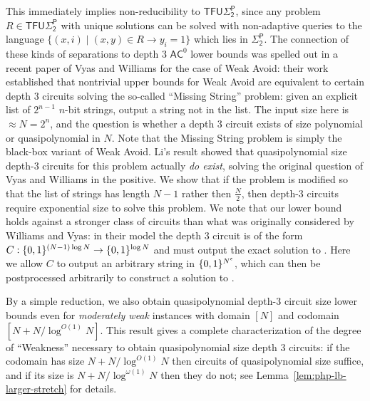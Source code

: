 This immediately implies non-reducibility to $\mathsf{TFU\Sigma_2^P}$, since any problem $R \in \mathsf{TFU\Sigma_2^P}$ with unique solutions can be solved with non-adaptive queries to the language $\{(x,i) \mid (x,y) \in R \rightarrow y_i=1\}$ which lies in $\mathsf{\Sigma_2^P}$. The connection of these kinds of separations to depth 3 $\mathsf{AC}^0$ lower bounds was spelled out in a recent paper of Vyas and Williams \cite{vyas-williams} for the case of {\sc Weak Avoid}: their work established that nontrivial upper bounds for {\sc Weak Avoid} are equivalent to certain depth 3 circuits solving the so-called ``Missing String'' problem: given an explicit list of $2^{n-1}$ $n$-bit strings, output a string not in the list. The input size here is $\approx N=2^n$, and the question is whether a depth 3 circuit exists of size polynomial or quasipolynomial in $N$. Note that the Missing String problem is simply the black-box variant of {\sc Weak Avoid}. Li's result showed that quasipolynomial size depth-3 circuits for this problem actually \emph{do exist}, solving the original question of Vyas and Williams in the positive. We show that if the problem is modified so that the list of strings has length $N-1$ rather then $\frac{N}{2}$, then depth-3 circuits require exponential size to solve this problem. We note that our lower bound holds against a stronger class of circuits than what was originally considered by Williams and Vyas: in their model the depth 3 circuit is of the form $ C:\{0,1\}^{(N-1) \log N } \to \{0,1\}^{ \log N}$ and must output the exact solution to \avoid. Here we allow $C$ to output an arbitrary string in $\{0,1\}^{N^{\epsilon}}$, which can then be postprocessed arbitrarily to construct a solution to \avoid.

By a simple reduction, we also obtain quasipolynomial depth-3 circuit size lower bounds even for \emph{moderately weak} \avoid instances with domain $[N]$ and codomain $[N + N/\log^{O(1)} N]$. This result gives a complete characterization of the degree of ``Weakness'' necessary to obtain quasipolynomial size depth 3 circuits: if the codomain has size $N + N/\log^{O(1)} N$ then circuits of quasipolynomial size suffice, and if its size is $N + N/\log^{\omega(1)}N$ then they do not; see Lemma~\ref{lem:php-lb-larger-stretch} for details.

